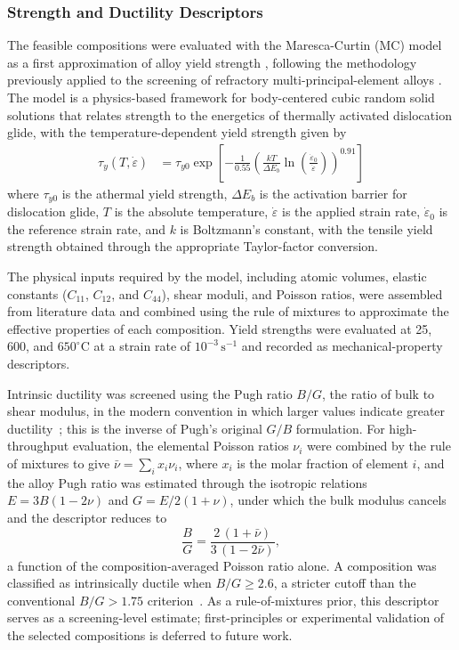 \subsubsection{Strength and Ductility Descriptors}
The feasible compositions were evaluated with the Maresca-Curtin (MC)
model as a first approximation of alloy yield strength
\cite{maresca2020mechanistic}, following the methodology previously applied
to the screening of refractory multi-principal-element alloys
\cite{vela2023data}. The model is a physics-based framework for
body-centered cubic random solid solutions that relates strength to the
energetics of thermally activated dislocation glide, with the
temperature-dependent yield strength given by
\begin{equation}
\begin{aligned}
\tau_y(T,\dot{\varepsilon})
&= \tau_{y0}
\exp\!\left[
-\frac{1}{0.55}
\left(
\frac{kT}{\Delta E_b}
\ln\!\left(\frac{\dot{\varepsilon}_0}{\dot{\varepsilon}}\right)
\right)^{0.91}
\right]
\end{aligned}
\label{eq:yield_stress}
\end{equation}
where $\tau_{y0}$ is the athermal yield strength, $\Delta E_b$ is the
activation barrier for dislocation glide, $T$ is the absolute temperature,
$\dot{\varepsilon}$ is the applied strain rate, $\dot{\varepsilon}_0$ is the
reference strain rate, and $k$ is Boltzmann's constant, with the tensile
yield strength obtained through the appropriate Taylor-factor conversion.

The physical inputs required by the model, including atomic volumes, elastic
constants ($C_{11}$, $C_{12}$, and $C_{44}$), shear moduli, and Poisson
ratios, were assembled from literature data and combined using the rule of
mixtures to approximate the effective properties of each composition. Yield
strengths were evaluated at 25, 600, and $650^{\circ}\mathrm{C}$ at a strain
rate of $10^{-3}\,\mathrm{s}^{-1}$ and recorded as mechanical-property
descriptors.

Intrinsic ductility was screened using the Pugh ratio \(B/G\), the ratio of
bulk to shear modulus, in the modern convention in which larger values
indicate greater ductility~\cite{pugh1954,singh2023ductility}; this is the
inverse of Pugh's original \(G/B\) formulation. For high-throughput
evaluation, the elemental Poisson ratios \(\nu_i\) were combined by the rule
of mixtures to give \(\bar{\nu}=\sum_i x_i \nu_i\), where $x_i$ is the molar fraction of element $i$, and the alloy Pugh ratio
was estimated through the isotropic relations \(E=3B(1-2\nu)\) and
\(G=E/2(1+\nu)\), under which the bulk modulus cancels and the descriptor
reduces to
\begin{equation}
\frac{B}{G}=\frac{2\,(1+\bar{\nu})}{3\,(1-2\bar{\nu})},
\label{eq:pugh}
\end{equation}
a function of the composition-averaged Poisson ratio alone. A composition was
classified as intrinsically ductile when \(B/G \ge 2.6\), a stricter cutoff than
the conventional \(B/G > 1.75\) criterion~\cite{singh2023ductility}. As a
rule-of-mixtures prior, this descriptor serves as a screening-level estimate;
first-principles or experimental validation of the selected compositions is
deferred to future work.


